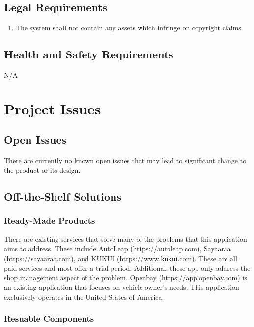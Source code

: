 \documentclass[12pt]{article}
\begin{document}
\subsection{Legal Requirements}
\begin{enumerate}[LR\arabic*.]
	\item The system shall not contain any assets which infringe on copyright claims
\end{enumerate}

\subsection{Health and Safety Requirements}
N/A

\section{Project Issues}

\subsection{Open Issues}

There are currently no known open issues that may lead to significant change to the product or its
design.

\subsection{Off-the-Shelf Solutions}

\subsubsection{Ready-Made Products}

There are existing services that solve many of the problems that this application aims to address.
These include AutoLeap (https://autoleap.com), Sayaaraa (https://sayaaraa.com), and KUKUI
(https://www.kukui.com). These are all paid services and most offer a trial period. Additional,
these app only address the shop management aspect of the problem. Openbay (https://app.openbay.com)
is an existing application that focuses on vehicle owner's needs. This application exclusively
operates in the United States of America.

\subsubsection{Resuable Components}
\end{document}
